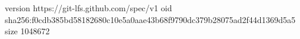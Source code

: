 version https://git-lfs.github.com/spec/v1
oid sha256:f0cdb385bd58182680c10e5a0aae43b68f9790dc379b28075ad2f44d1369d5a5
size 1048672
